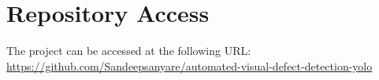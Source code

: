 \section*{Repository Access}
The project can be accessed at the following URL: \\
\url{https://github.com/Sandeepsanyare/automated-visual-defect-detection-yolo}